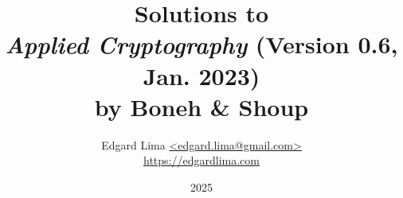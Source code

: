 \documentclass[a4paper,12pt,fleqn]{book}
\begin{document}
\author{Edgard Lima \href{mailto:edgard.lima@gmail.com}{\textless edgard.lima@gmail.com\textgreater} \\
\href{https://edgardlima.com}{https://edgardlima.com}}
\title{Solutions to \\  \textit{Applied Cryptography} (Version 0.6, Jan. 2023) \\ by Boneh \& Shoup}

\date{2025}

\frontmatter
\maketitle
\tableofcontents

\mainmatter

\setcounter{chapter}{1}

% 

\backmatter
\end{document}
